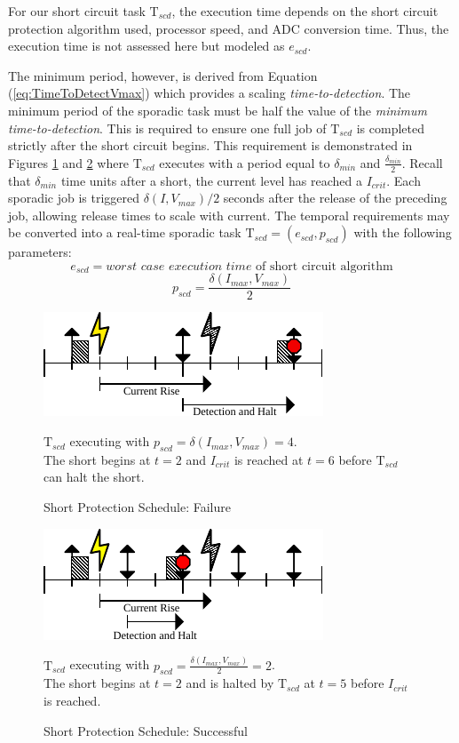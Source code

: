 For our short circuit task $\mathrm{T}_{scd}$, the execution time depends on the short circuit protection algorithm used, processor speed, and ADC conversion time.
Thus, the execution time is not assessed here but modeled as $e_{scd}$.

The minimum period, however, is derived from Equation (\ref{eq:TimeToDetectVmax}) which provides a scaling \textit{time-to-detection}.
The minimum period of the sporadic task must be half the value of the \textit{minimum time-to-detection}.
This is required to ensure one full job of $\mathrm{T}_{scd}$ is completed strictly after the short circuit begins.
This requirement is demonstrated in Figures \ref{fig:shortedschedule} and \ref{fig:stoppedschedule} where $\mathrm{T}_{scd}$ executes with a period equal to $\delta_{min}$ and $\frac{\delta_{min}}{2}$.
Recall that $\delta_{min}$ time units after a short, the current level has reached a $I_{crit}$.
Each sporadic job is triggered $\delta(I,V_{max})/2$ seconds after the release of the preceding job, allowing release times to scale with current.
The temporal requirements may be converted into a real-time sporadic task $\mathrm{T}_{scd} = (e_{scd}, p_{scd})$ with the following parameters:
\begin{equation}\label{eq:ExecutionTime}
e_{scd} = \textit{worst case execution time }\text{of short circuit algorithm}
\end{equation}
\begin{equation}\label{eq:Period}
p_{scd} = \frac{\delta(I_{max},V_{max})}{2}
\end{equation}
\begin{figure}
    \centering
    \includegraphics[width=0.60\linewidth]{fig/shortedschedule.pdf}
    \caption{Short Protection Schedule: Failure} $\mathrm{T}_{scd}$ executing with $p_{scd} = \delta(I_{max},V_{max}) = 4$.\\The short begins at $t = 2$ and $I_{crit}$ is reached at $t = 6$ before $\mathrm{T}_{scd}$ can halt the short.
    \label{fig:shortedschedule}
\end{figure}
\begin{figure}
    \centering
    \includegraphics[width=0.60\linewidth]{fig/stoppedschedule.pdf}
    \caption{Short Protection Schedule: Successful} $\mathrm{T}_{scd}$ executing with $p_{scd} = \frac{\delta(I_{max},V_{max})}{2} = 2$.\\The short begins at $t = 2$ and is halted by $\mathrm{T}_{scd}$ at $t = 5$ before $I_{crit}$ is reached.
    \label{fig:stoppedschedule}
\end{figure}
